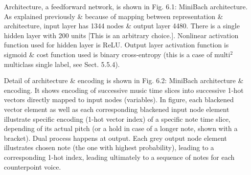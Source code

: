 \documentclass{article}
\begin{document}
\begin{itemize}
\begin{itemize}
\begin{itemize}
			Architecture, a feedforward network, is shown in {\sf Fig. 6.1: MiniBach architecture}. As explained previously \& because of mapping between representation \& architecture, input layer has 1344 nodes \& output layer 4480. There is a single hidden layer with 200 units [This is an arbitrary choice.]. Nonlinear activation function used for hidden layer is ReLU. Output layer activation function is sigmoid \& cost function used is binary cross-entropy (this is a case of multi${}^2$ multiclass single label, see Sect. 5.5.4).

			Detail of architecture \& encoding is shown in {\sf Fig. 6.2: MiniBach architecture \& encoding}. It shows encoding of successive music time slices into successive 1-hot vectors directly mapped to input nodes (variables). In figure, each blackened vector element as well as each corresponding blackened input node element illustrate specific encoding (1-hot vector index) of a specific note time slice, depending of its actual pitch (or a hold in case of a longer note, shown with a bracket). Dual process happens at output. Each grey output node element illustrates chosen note (the one with highest probability), leading to a corresponding 1-hot index, leading ultimately to a sequence of notes for each counterpoint voice.


\end{itemize}
\end{itemize}
\end{itemize}
\end{document}
